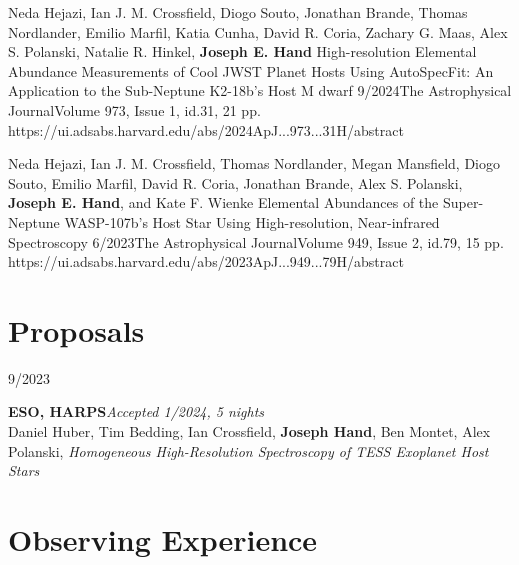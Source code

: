 \documentclass[12pt]{article}
\begin{document}
\publication
{Neda Hejazi, Ian J. M. Crossfield, Diogo Souto, Jonathan Brande, Thomas Nordlander, Emilio Marfil, Katia Cunha, David R. Coria, Zachary G. Maas, Alex S. Polanski, Natalie R. Hinkel, \textbf{Joseph E. Hand}}
{High-resolution Elemental Abundance Measurements of Cool JWST Planet Hosts Using AutoSpecFit: An Application to the Sub-Neptune K2-18b's Host M dwarf}
{9/2024}{The Astrophysical Journal}{Volume 973, Issue 1, id.31, 21 pp.}
{https://ui.adsabs.harvard.edu/abs/2024ApJ...973...31H/abstract}

\publication
{Neda Hejazi, Ian J. M. Crossfield, Thomas Nordlander, Megan Mansfield, Diogo Souto, Emilio Marfil, David R. Coria, Jonathan Brande, Alex S. Polanski, \textbf{Joseph E. Hand}, and Kate F. Wienke}
{Elemental Abundances of the Super-Neptune WASP-107b's Host Star Using High-resolution, Near-infrared Spectroscopy}
{6/2023}{The Astrophysical Journal}{Volume 949, Issue 2, id.79, 15 pp.}
{https://ui.adsabs.harvard.edu/abs/2023ApJ...949...79H/abstract}

\section*{Proposals}\vspace{-1ex}

\newcommand{\proposal}[5]{
  \medskip
  \begin{minipage}[t]{0.75in}
    #3
  \end{minipage}
  \begin{minipage}[t]{\dimexpr\textwidth-0.75in}
    \textbf{#4}\hfill \textit{#5}\\
    #1, \textit{#2}
  \end{minipage}

}

\proposal{Daniel Huber, Tim Bedding, Ian Crossfield, \textbf{Joseph Hand}, Ben Montet, Alex Polanski}{Homogeneous High-Resolution Spectroscopy of TESS Exoplanet Host Stars}{9/2023}{ESO, HARPS}{Accepted 1/2024, 5 nights}

\section*{Observing Experience}\vspace{-1ex}

\newcommand{\observing}[3]{
  \medskip
  \begin{minipage}[t]{0.75in}
    #1
  \end{minipage}
  \begin{minipage}[t]{\dimexpr\textwidth-0.75in}
    \textbf{#2}\\
    #3
  \end{minipage}

}
\end{document}
